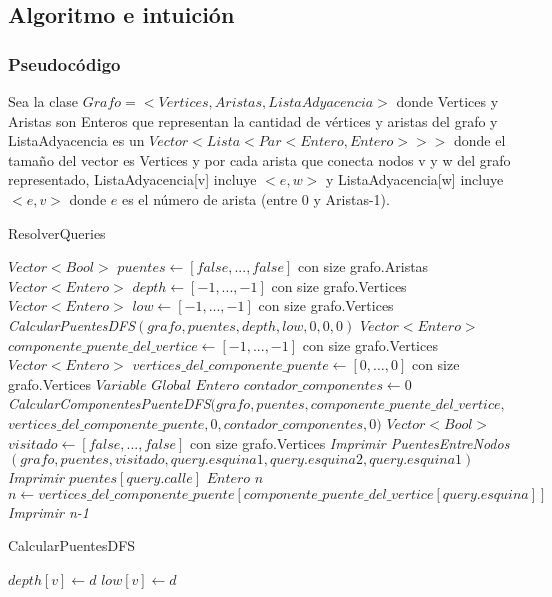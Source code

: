 \subsection{Algoritmo e intuición}

\subsubsection*{Pseudocódigo}

Sea la clase $Grafo = <Vertices, Aristas, ListaAdyacencia>$
	donde Vertices y Aristas son Enteros que representan la cantidad de vértices y aristas del grafo y
	ListaAdyacencia es un $Vector<Lista<Par<Entero, Entero>>>$ donde
	el tamaño del vector es Vertices y por cada arista que conecta nodos v 
	y w del grafo representado, ListaAdyacencia[v] incluye $<e, w>$ y
	ListaAdyacencia[w] incluye $<e, v>$ donde $e$ es el número de arista (entre 0 y Aristas-1).

\begin{algorithm}[]
    \caption{ResolverQueries}
    $Vector<Bool>$ $puentes \gets [false,...,false]$ con size grafo.Aristas \;
	$Vector<Entero>$ $depth \gets [-1,...,-1]$ con size grafo.Vertices \;
	$Vector<Entero>$ $low \gets [-1,...,-1]$ con size grafo.Vertices \;
	\emph{CalcularPuentesDFS$(grafo, puentes, depth, low, 0, 0, 0)$} \;
	$Vector<Entero>$ $componente\_puente\_del\_vertice \gets [-1,...,-1]$ con size grafo.Vertices \;
	$Vector<Entero>$ $vertices\_del\_componente\_puente \gets [0,...,0]$ con size grafo.Vertices \;
	$Variable$ $Global$ $Entero$ $contador\_componentes \gets 0$ \;
	\emph{CalcularComponentesPuenteDFS$(grafo, puentes, componente\_puente\_del\_vertice, $ $ vertices\_del\_componente\_puente, 0, contador\_componentes, 0)$} \;
	 {
		 {
			$Vector<Bool>$ $visitado \gets [false,...,false]$ con size grafo.Vertices \;
			\emph{Imprimir PuentesEntreNodos$(grafo, puentes, visitado, query.esquina1, query.esquina2, query.esquina1)$}
		}
		 {
			\emph{Imprimir $puentes[query.calle]$}
		}
		 {
			$Entero$ $n$ \;
			$n \gets vertices\_del\_componente\_puente[componente\_puente\_del\_vertice[query.esquina]]$ \;
			\emph{Imprimir n-1}
		}
	}
\end{algorithm}

\begin{algorithm}[]
    \caption{CalcularPuentesDFS}
    $depth[v] \gets d$ \;
	$low[v] \gets d$ \;
	 {
	}
\end{algorithm}

